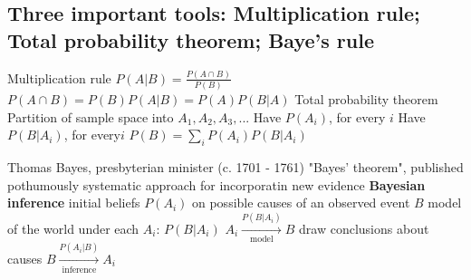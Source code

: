 \subsection{Three \textbf{important} tools: Multiplication rule; Total probability theorem; Baye's rule} 
\begin{outline}
\1 Multiplication rule
  \2 $P(A|B) = \frac{P(A \cap B)}{P(B)}$
  \2 $P(A \cap B) = P(B)P(A|B) = P(A)P(B|A)$
\1 Total probability theorem
  \2 Partition of sample space into $A_1, A_2, A_3, ...$
  \2 Have $P(A_i)$, for every $i$
  \2 Have $P(B|A_i)$, for every$i$
  \2 $P(B) = \sum\limits_{i} P(A_i)P(B|A_i)$
\end{outline}

\begin{outline}
\1 Thomas Bayes, presbyterian minister (c. 1701 - 1761)
\1 "Bayes' theorem", published pothumously
\1 systematic approach for incorporatin new evidence
\1 \textbf{Bayesian inference}
  \2 initial beliefs $P(A_i)$ on possible causes of an observed event $B$
  \2 model of the world under each $A_i$: $P(B|A_i)$
    \3 $A_i \xrightarrow[\text{model}]{P(B|A_i)} B$
  \2 draw conclusions about causes
    \3 $B \xrightarrow[\text{inference}]{P(A_i|B)} A_i$
\end{outline}




